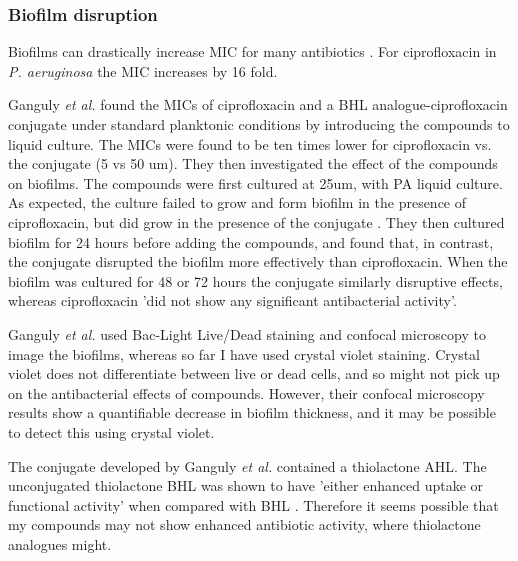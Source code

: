 \subsubsection{Biofilm disruption}



Biofilms can drastically increase MIC for many antibiotics \cite{Ceri1999}. For ciprofloxacin in \textit{P. aeruginosa} the MIC increases by 16 fold. 

Ganguly \textit{et al.} \cite{Ganguly2011} found the MICs of ciprofloxacin and a BHL analogue-ciprofloxacin  conjugate under standard planktonic conditions by introducing the compounds to liquid culture. The MICs were found to be ten times lower for ciprofloxacin vs. the conjugate  (5 vs 50 um). They then investigated the effect of the compounds on biofilms. The compounds were first cultured at 25um, with PA liquid culture. As expected, the culture failed to grow and form biofilm in the presence of ciprofloxacin, but did grow in the presence of the conjugate . They then cultured biofilm for 24 hours before adding the compounds, and found that, in contrast, the conjugate  disrupted the biofilm more effectively than ciprofloxacin. When the biofilm was cultured for 48 or 72 hours the conjugate similarly disruptive effects, whereas ciprofloxacin 'did not show any significant antibacterial activity'.

Ganguly \textit{et al.} used Bac-Light Live/Dead staining and confocal microscopy to image the biofilms, whereas so far I have used crystal violet staining. Crystal violet does not differentiate between live or dead cells, and so might not pick up on the antibacterial effects of compounds. However, their confocal microscopy results show a quantifiable decrease in biofilm thickness, and it may be possible to detect this using crystal violet.

The conjugate  developed by Ganguly \textit{et al.} contained a thiolactone AHL. The unconjugated thiolactone BHL  was shown to have 'either enhanced uptake or functional activity' when compared with BHL . Therefore it seems possible that my compounds may not show enhanced antibiotic activity, where thiolactone analogues might.